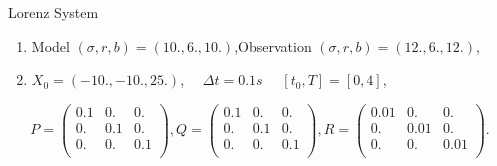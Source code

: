 \begin{frame}[allowframebreaks]{Lorenz System}
       \begin{figure}
           \centering
       \end{figure}
   
       \newpage
    
       \begin{enumerate}[\textbullet]
                \item Model $(\sigma, r, b)=(10.,6.,10.)$,Observation $(\sigma, r, b)=(12.,6.,12.)$,
               \item $X_0=(-10.,-10.,25.)$, $\quad \Delta t=0.1s$ $\quad [t_0,T]=[0,4]$,
       \end{enumerate}
       $$P=\begin{pmatrix}
       0.1 & 0. & 0. \\
       0. & 0.1 & 0. \\
       0. & 0. & 0.1 \\
       \end{pmatrix} ,
       Q=\begin{pmatrix}
       0.1 & 0. & 0. \\
       0. & 0.1 & 0. \\
       0. & 0. & 0.1 \\
       \end{pmatrix},
       R=\begin{pmatrix}
       0.01 & 0. & 0. \\
       0. & 0.01 & 0. \\
       0. & 0. & 0.01 \\
       \end{pmatrix}.$$ 
   
       \begin{figure}
           \centering
       \end{figure}
   \end{frame}
       